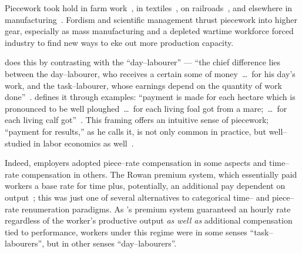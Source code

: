 \documentclass[trackingWork]{subfiles}
\begin{document}
Piecework took hold in farm work~\cite{hughRaynbirdTaskWork},
in textiles~\cite{restructuringPieceworkBaker,riisOtherSideLives},
on railroads~\cite{Brown01041990}, and 
elsewhere in manufacturing~\cite{10.2307/3827491}.
Fordism and scientific management thrust piecework into higher gear, especially as
mass manufacturing and
a depleted wartime workforce forced industry to find new ways to eke out more production capacity.


\citeauthor{hughRaynbirdTaskWork} does this by contrasting with the ``day--labourer'' ---
``the chief difference lies between the day--labourer,
who receives a certain some of money~\dots~for his day's work,
and the task--labourer, whose earnings depend on the quantity of work done''~\cite{hughRaynbirdTaskWork}.
\citeauthor{10.2307/2338394} defines it through examples:
``payment is made for each hectare which is pronounced to be well ploughed~\dots~for each living foal got from a mare;~\dots~for each living calf got''~\cite{10.2307/2338394}.
This framing offers an intuitive sense of piecework;
``payment for results,'' as he calls it,
is not only common in practice, but
well--studied in labor economics as well~\cite{Figlio2007901,weitzman1976new,10.2307/3003414,BJIR:BJIR038}.

Indeed, employers adopted piece--rate compensation in some aspects and
time--rate compensation in others.
The Rowan premium system,
which essentially paid workers
a base rate for time plus, potentially,
an additional pay dependent on output~\cite{rowan1901premium};
this was just one of several alternatives to categorical time-- and piece--rate renumeration paradigms.
As \citeauthor{rowan1901premium}'s premium system guaranteed an hourly rate
regardless of the worker's productive output
\textit{as well as} additional compensation tied to performance,
workers under this regime were
in some senses ``task--labourers'', but
in other senses ``day--labourers''.
\end{document}
